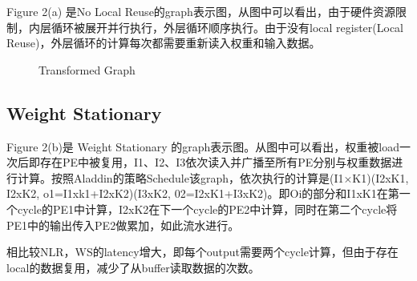 \documentclass[UTF8]{scrartcl}
\begin{document}
		Figure 2(a) 是No Local Reuse的graph表示图，从图中可以看出，由于硬件资源限制，内层循环被展开并行执行，外层循环顺序执行。由于没有local register(Local Reuse)，外层循环的计算每次都需要重新读入权重和输入数据。
		
	
	\begin{figure}[h]
		\centering
		\caption{Transformed Graph}
		\label{fig2}
	\end{figure}
	
	
	\subsection{Weight Stationary}
	   Figure 2(b)是 Weight Stationary 的graph表示图。从图中可以看出，权重被load一次后即存在PE中被复用，I1、I2、I3依次读入并广播至所有PE分别与权重数据进行计算。按照Aladdin的策略Schedule该graph，依次执行的计算是(I1×K1)(I2xK1, I2xK2, o1=I1xk1+I2xK2)(I3xK2, 02=I2xK1+I3xK2)。即Oi的部分和I1xK1在第一个cycle的PE1中计算，I2xK2在下一个cycle的PE2中计算，同时在第二个cycle将PE1中的输出传入PE2做累加，如此流水进行。
	   
	   相比较NLR，WS的latency增大，即每个output需要两个cycle计算，但由于存在local的数据复用，减少了从buffer读取数据的次数。
	   
\end{document}
